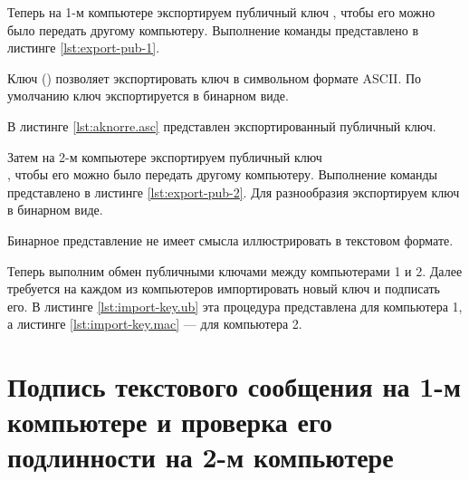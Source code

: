 Теперь на 1-м компьютере экспортируем публичный ключ , чтобы его можно было передать другому компьютеру. Выполнение команды представлено в листинге \ref{lst:export-pub-1}.



Ключ  () позволяет экспортировать ключ в символьном формате ASCII. По умолчанию ключ экспортируется в бинарном виде.

В листинге \ref{lst:aknorre.asc} представлен экспортированный публичный ключ.




Затем на 2-м компьютере экспортируем публичный ключ\\ , чтобы его можно было передать другому компьютеру. Выполнение команды представлено в листинге \ref{lst:export-pub-2}. Для разнообразия экспортируем ключ в бинарном виде.



Бинарное представление не имеет смысла иллюстрировать в текстовом формате.

Теперь выполним обмен публичными ключами между компьютерами 1 и 2. Далее требуется на каждом из компьютеров импортировать новый ключ и подписать его. В листинге \ref{lst:import-key.ub} эта процедура представлена для компьютера 1, а листинге \ref{lst:import-key.mac} --- для компьютера 2.





\section{Подпись текстового сообщения на 1-м компьютере и проверка его подлинности на 2-м компьютере}

